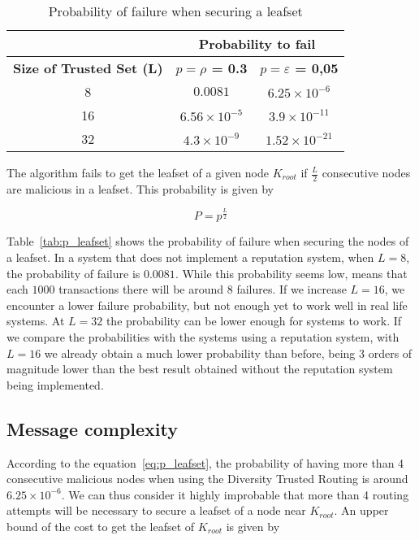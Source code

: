   \begin{table}
    \centering
    \footnotesize
    \begin{tabular}{|c|c|c|}
      \cline{2-3}
      \multicolumn{1}{c|}{}&  \multicolumn{2}{c|}{\textbf{Probability to fail}} \\ \cline{2-3}
      \hline
      \textbf{Size of Trusted Set (L)} & \textbf{$p = \rho$ = 0.3} & \textbf{$p = \varepsilon$ = 0,05} \\
      \hline \hline
      8 &  $0.0081$              & $6.25 \times 10^{-6}$  \\
      \hline
      16 & $6.56 \times 10^{-5}$ & $ 3.9 \times 10^{-11}$ \\
      \hline
      32 & $4.3 \times 10^{-9}$  & $ 1.52 \times 10^{-21} $  \\
      \hline
    \end{tabular}
    \caption{Probability of failure when securing a leafset}
    \label{tab:p_leafset}
  \end{table}

  The algorithm fails to get the leafset of a given node
  $K_{root}$ if $\frac{L}{2}$ consecutive nodes are malicious in a leafset. This
  probability is given by
  
  \begin{equation} \label{eq:p_leafset}
    P= p^{\frac{L}{2}}
  \end{equation}

  
  Table~\eqref{tab:p_leafset} shows the probability of failure when securing the
  nodes of a leafset. In a system that does not implement a reputation system,
when $L=8$, the probability of failure is $0.0081$. While this probability seems
low, means that each $1000$ transactions there will be around $8$ failures. If
we increase $L=16$, we encounter a lower failure probability, but not enough
yet to work well in real life systems. At $L=32$ the probability can be lower
enough for systems to work. If we compare the probabilities with the systems
using a reputation system, with $L=16$ we already obtain a much lower
probability than before, being 3 orders of magnitude lower than the best result
obtained without the reputation system being implemented.
  
  
  \subsection{Message complexity}

      According to the equation~\eqref{eq:p_leafset}, the probability of having
more than 4 consecutive malicious nodes when using the Diversity Trusted
Routing is around $6.25 \times 10^{-6}$. We can thus consider it highly
improbable that more than 4 routing attempts will be necessary  to secure a
leafset of a node near $K_{root}$. An upper bound of the cost to get the
leafset of $K_{root}$ is given by
      

